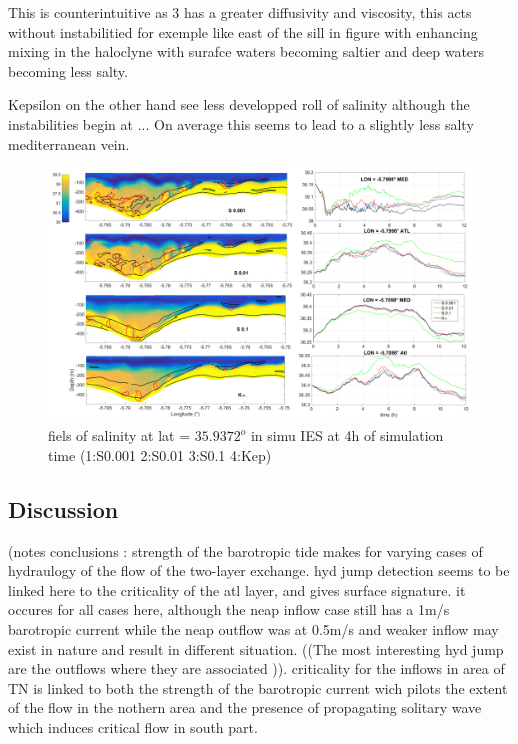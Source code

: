 This is counterintuitive as 3 has a greater diffusivity and viscosity, this acts without instabilitied for exemple like east of the sill in figure with enhancing mixing in the haloclyne with surafce waters becoming saltier and deep waters becoming less salty.

Kepsilon on the other hand see less developped roll of salinity although the instabilities begin at ... On average this seems to lead to a slightly less salty mediterranean vein.


\begin{figure}[!h]
 \includegraphics[width=\textwidth]{./GBR3D/Figsmago.png}
 \caption {fiels of salinity at lat = $35.9372^o$ in simu IES at 4h of simulation time  (1:S0.001  2:S0.01  3:S0.1 4:Kep)}
\end{figure}

\subsection{Discussion}


(notes conclusions : strength of the barotropic tide makes for varying cases of hydraulogy of the flow of the two-layer exchange. hyd jump detection seems to be linked here to the criticality of the atl layer, and gives surface signature. it occures for all cases here, although the neap inflow case still has a 1m/s barotropic current while the neap outflow was at 0.5m/s and weaker inflow may exist in nature and result in different situation. ((The most interesting hyd jump are the outflows where they are associated  )). criticality for the inflows in area of TN is linked to both the strength of the barotropic current wich pilots the extent of the flow in the nothern area and the presence of propagating solitary wave which induces critical flow in south part.

